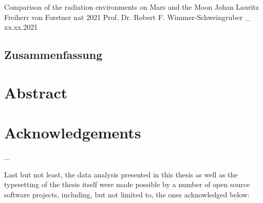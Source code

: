 \documentclass[11pt]{book}
\begin{document}
\frontmatter
  \disstitlepage
    {Comparison of the radiation environments on Mars and the Moon}
    {}
    {Johan Lauritz Freiherr von Forstner}
    {nat}
    {2021}
  \dissreviewerpage
  	{Prof. Dr. Robert F. Wimmer-Schweingruber}
  	{_}
  	{}
  	{xx.xx.2021}
  \disseidesstatt 
  
\begin{otherlanguage}{ngerman}
  \chapter*{Zusammenfassung}
  
\end{otherlanguage}

\chapter*{Abstract}


  \cleardoublepage
  \tableofcontents{}

\mainmatter


\backmatter

\chapter{Acknowledgements}

...

Last but not least, the data analysis presented in this thesis as well as the typesetting of the thesis itself were 
made possible by a number of open source software projects, including, but not limited to, the ones acknowledged below:

\begin{refsection}
	\nocite{*}
	\newrefcontext[sorting=none]
	\printbibliography[heading=none]
\end{refsection}

  \newrefcontext[sorting=nyt]
  \tocbibliography
  \clearpage  
  \listoffigures\clearpage
  \listoftables
\end{document}
